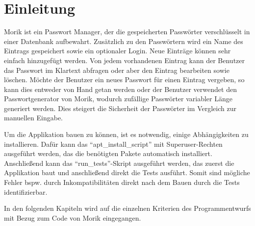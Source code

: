 \chapter{Einleitung}
Morik ist ein Passwort Manager, der die gespeicherten Passwörter verschlüsselt in einer Datenbank aufbewahrt. Zusätzlich zu den Passwörtern wird ein Name des Eintrags gespeichert sowie ein optionaler Login. Neue Einträge können sehr einfach hinzugefügt werden. Von jedem vorhandenen Eintrag kann der Benutzer das Passwort im Klartext abfragen oder aber den Eintrag bearbeiten sowie löschen. Möchte der Benutzer ein neues Passwort für einen Eintrag vergeben, so kann dies entweder von Hand getan werden oder der Benutzer verwendet den Passwortgenerator von Morik, wodurch zufällige Passwörter variabler Länge generiert werden. Dies steigert die Sicherheit der Passwörter im Vergleich zur manuellen Eingabe.

Um die Applikation bauen zu können, ist es notwendig, einige Abhängigkeiten zu installieren. Dafür kann das \enquote{apt\_install\_script} mit Superuser-Rechten ausgeführt werden, das die benötigten Pakete automatisch installiert. Anschließend kann das \enquote{run\_tests}-Skript ausgeführt werden, das zuerst die Applikation baut und anschließend direkt die Tests ausführt. Somit sind mögliche Fehler bspw. durch Inkompatibilitäten direkt nach dem Bauen durch die Tests identifizierbar.

In den folgenden Kapiteln wird auf die einzelnen Kriterien des Programmentwurfs mit Bezug zum Code von Morik eingegangen.
